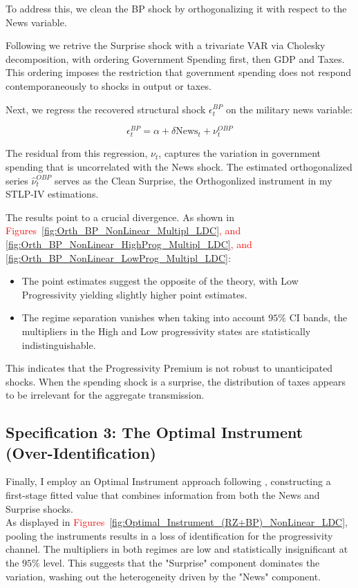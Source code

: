 \documentclass[12pt,letterpaper]{article}
\begin{document}
To address this, we clean the BP shock by orthogonalizing it with respect to the \cite{RameyZubairy2018} News variable. 

Following \cite{BP} we retrive the Surprise shock with a trivariate VAR via Cholesky decomposition, with ordering Government Spending first, then GDP and Taxes. This ordering imposes the restriction that government spending does not respond contemporaneously to shocks in output or taxes.

Next, we regress the recovered structural shock $\epsilon^{BP}_t$ on the military news variable:

\begin{equation}
    \epsilon^{BP}_t = \alpha + \delta \text{News}_t + \nu^{OBP}_t
    \label{eq:orthogonalization}
\end{equation}

The residual from this regression, $\nu_t$, captures the variation in government spending that is uncorrelated with the News shock. The estimated orthogonalized series $\hat\nu^{OBP}_t$ serves as the Clean Surprise, the Orthogonlized \cite{BP} instrument in my STLP-IV estimations.

The results point to a crucial divergence. As shown in \textcolor{red}{Figures~\ref{fig:Orth_BP_NonLinear_Multipl_LDC}, and \ref{fig:Orth_BP_NonLinear_HighProg_Multipl_LDC}, and \ref{fig:Orth_BP_NonLinear_LowProg_Multipl_LDC}}:
\begin{itemize}
    \item The point estimates suggest the opposite of the theory, with Low Progressivity yielding slightly higher point estimates.
    \item The regime separation vanishes when taking into account $95\%$ CI bands, the multipliers in the High and Low progressivity states are statistically indistinguishable.
\end{itemize}
This indicates that the Progressivity Premium is not robust to unanticipated shocks. When the spending shock is a surprise, the distribution of taxes appears to be irrelevant for the aggregate transmission.

\subsection{Specification 3: The Optimal Instrument (Over-Identification)}
Finally, I employ an Optimal Instrument approach following \cite{MostlyHarmlessEconometrics}, constructing a first-stage fitted value that combines information from both the News and Surprise shocks.
\\
As displayed in \textcolor{red}{Figures~\ref{fig:Optimal_Instrument_(RZ+BP)_NonLinear_LDC}}, pooling the instruments results in a loss of identification for the progressivity channel. The multipliers in both regimes are low and statistically insignificant at the $95\%$ level. This suggests that the "Surprise" component dominates the variation, washing out the heterogeneity driven by the "News" component.
\end{document}
